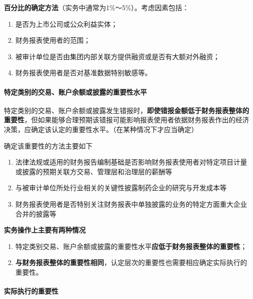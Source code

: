 \documentclass[UTF8,12pt]{ctexart}
\numberwithin{equation}{section} %
\numberwithin{figure}{section}
\numberwithin{table}{section}
\begin{document}
	
	\textbf{百分比的确定方法}（实务中通常为1\%～5\%）。考虑因素包括：
	\begin{enumerate}
		\item 是否为上市公司或公众利益实体；
		
		\item 财务报表使用者的范围；
		
		\item 被审计单位是否由集团内部关联方提供融资或是否有大额对外融资；
		
		\item 财务报表使用者是否对基准数据特别敏感等。
		
	\end{enumerate}
	
	\paragraph{特定类别的交易、账户余额或披露的重要性水平}
	特定类别的交易、账户余额或披露发生错报时，\textbf{即使错报金额低于财务报表整体的重要性}，但如果能够合理预期该错报可能影响报表使用者依据财务报表作出的经济决策，应确定该认定的重要性水平。（在某种情况下才应当确定）
	
	确定该重要性的方法主要如下
	\begin{enumerate}
		\item 法律法规或适用的财务报告编制基础是否影响财务报表使用者对特定项目计量或披露的预期关联方交易、管理层和治理层的薪酬等
		
		\item 与被审计单位所处行业相关的关键性披露制药企业的研究与开发成本等
		
		\item 财务报表使用者是否特别关注财务报表中单独披露的业务的特定方面重大企业合并的披露等
	\end{enumerate}
	
	\textbf{实务操作上主要有两种情况}
	\begin{enumerate}
		\item 特定类别交易、账户余额或披露的重要性水平\textbf{应低于财务报表整体的重要性}；
		
		\item \textbf{与财务报表整体的重要性相同}，认定层次的重要性也需要相应确定实际执行的重要性。
	\end{enumerate}

	
	\paragraph{实际执行的重要性}
	
\end{document}
